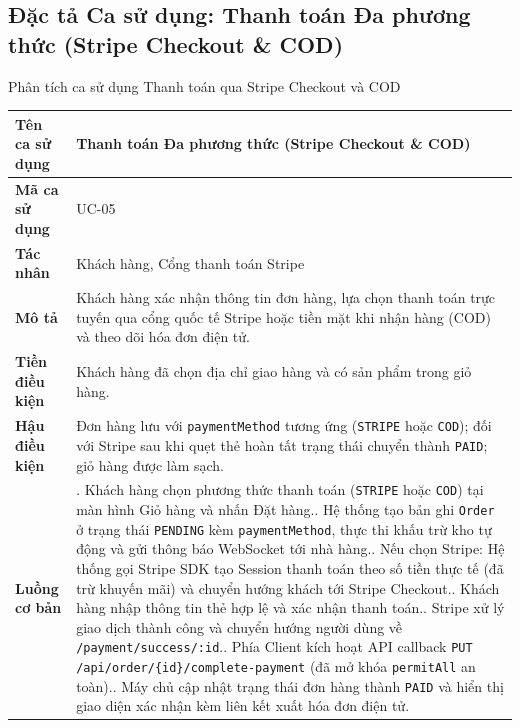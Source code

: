 \documentclass{uetgraduation}
\begin{document}
\clearpage
\subsection{Đặc tả Ca sử dụng: Thanh toán Đa phương thức (Stripe Checkout \& COD)}
\begin{table}[!htbp]{Phân tích ca sử dụng Thanh toán qua Stripe Checkout và COD}
\centering
\small
\begin{tabularx}{\textwidth}{|l|>{\raggedright\arraybackslash}X|}
\hline
\textbf{Tên ca sử dụng} & \textbf{Thanh toán Đa phương thức (Stripe Checkout \& COD)} \\ \hline
\textbf{Mã ca sử dụng} & UC-05 \\ \hline
\textbf{Tác nhân} & Khách hàng, Cổng thanh toán Stripe \\ \hline
\textbf{Mô tả} & Khách hàng xác nhận thông tin đơn hàng, lựa chọn thanh toán trực tuyến qua cổng quốc tế Stripe hoặc tiền mặt khi nhận hàng (COD) và theo dõi hóa đơn điện tử. \\ \hline
\textbf{Tiền điều kiện} & Khách hàng đã chọn địa chỉ giao hàng và có sản phẩm trong giỏ hàng. \\ \hline
\textbf{Hậu điều kiện} & Đơn hàng lưu với \texttt{paymentMethod} tương ứng (\texttt{STRIPE} hoặc \texttt{COD}); đối với Stripe sau khi quẹt thẻ hoàn tất trạng thái chuyển thành \texttt{PAID}; giỏ hàng được làm sạch. \\ \hline
\textbf{Luồng cơ bản} & 
1. Khách hàng chọn phương thức thanh toán (\texttt{STRIPE} hoặc \texttt{COD}) tại màn hình Giỏ hàng và nhấn Đặt hàng.\newline
2. Hệ thống tạo bản ghi \texttt{Order} ở trạng thái \texttt{PENDING} kèm \texttt{paymentMethod}, thực thi khấu trừ kho tự động và gửi thông báo WebSocket tới nhà hàng.\newline
3. Nếu chọn Stripe: Hệ thống gọi Stripe SDK tạo Session thanh toán theo số tiền thực tế (đã trừ khuyến mãi) và chuyển hướng khách tới Stripe Checkout.\newline
4. Khách hàng nhập thông tin thẻ hợp lệ và xác nhận thanh toán.\newline
5. Stripe xử lý giao dịch thành công và chuyển hướng người dùng về \texttt{/payment/success/:id}.\newline
6. Phía Client kích hoạt API callback \texttt{PUT /api/order/\{id\}/complete-payment} (đã mở khóa \texttt{permitAll} an toàn).\newline
7. Máy chủ cập nhật trạng thái đơn hàng thành \texttt{PAID} và hiển thị giao diện xác nhận kèm liên kết xuất hóa đơn điện tử. \\ \hline

\end{tabularx}
\end{table}
\end{document}

